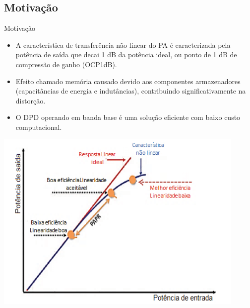 \documentclass{if-beamer}
\begin{document}
\subsection{Motivação}
\begin{frame}{Motivação}
	
	\begin{minipage}{.49\textwidth}
		
		\begin{itemize}
			\item A característica de transferência não linear do PA é caracterizada pela potência de saída que decai 1 dB da potência ideal, ou ponto de 1 dB de compressão de ganho (OCP1dB).
			\item  Efeito chamado memória causado devido aos componentes armazenadores (capacitâncias de energia e indutâncias), contribuindo significativamente na distorção.
			\item  O DPD operando em banda base é uma solução eficiente com baixo custo computacional.
		
		\end{itemize}
		
		
	\end{minipage}
	\begin{minipage}{.49\textwidth}
		\includegraphics[scale=0.5]{curvasaidaparf.png}
	\end{minipage}
	
\end{frame}


\end{document}
